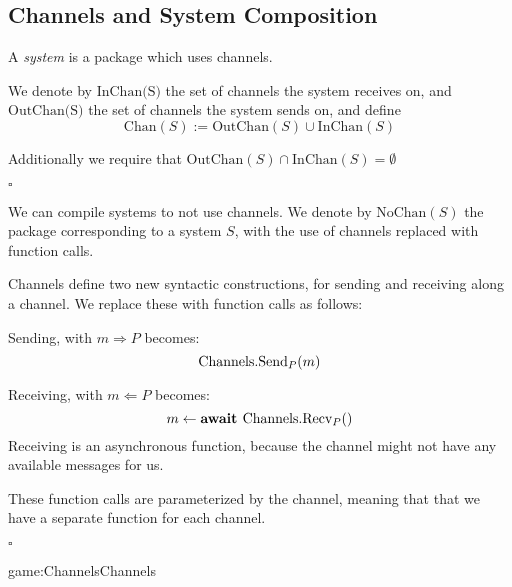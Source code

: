 \begin{lemma}
\end{lemma}

\begin{lemma}
\end{lemma}

\subsection{Channels and System Composition}


\begin{definition}[Systems]
A \emph{system} is a package which uses channels.

We denote by $\text{InChan(S)}$ the set of channels the system receives on,
and $\text{OutChan(S)}$ the set of channels the system sends on,
and define
$$
\text{Chan}(S) := \text{OutChan}(S) \cup \text{InChan}(S)
$$

Additionally we require that $\text{OutChan}(S) \cap \text{InChan}(S) = \emptyset$

$\square$
\end{definition}

\begin{definition}
We can compile systems to not use channels.
We denote by $\text{NoChan}(S)$ the package corresponding to
a system $S$, with the use of channels replaced with function calls.

Channels define two new syntactic constructions, for sending and receiving
along a channel.
We replace these with function calls as follows:


Sending, with $m \Rightarrow P$ becomes:
$$
\text{Channels}.\text{Send}_P(m)
$$

Receiving, with $m \Leftarrow P$ becomes:
$$
m \gets \textbf{await } \text{Channels}.\text{Recv}_P()
$$
Receiving is an asynchronous function, because the channel might not have
any available messages for us.

These function calls are parameterized by the channel, meaning
that that we have a separate function for each channel.

$\square$
\end{definition}

\begin{game}{game:Channels}{Channels}
\end{game}


